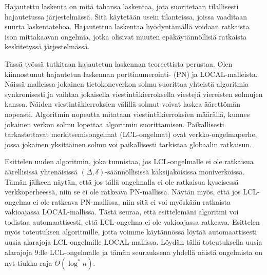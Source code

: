 \begin{abstractpage}[finnish]
Hajautettu laskenta on mitä tahansa laskentaa, jota suoritetaan tilallisesti hajautetussa järjestelmässä.
Sitä käytetään usein tilanteissa, joissa vaaditaan suurta laskentatehoa.
Hajautettua laskentaa hyödyntämällä voidaan ratkaista ison mittakaavan ongelmia, jotka olisivat muuten epäkäytännöllisiä ratkaista keskitetyssä järjestelmässä.

Tässä työssä tutkitaan hajautetun laskennan teoreettista perustaa.
Olen kiinnostunut hajautetun laskennan porttinumerointi- (PN) ja LOCAL-malleista.
Näissä malleissa jokainen tietokoneverkon solmu suorittaa yhteistä algoritmia synkronisesti ja vaihtaa jokaisella viestintäkierroksella viestejä viereisten solmujen kanssa.
Näiden viestintäkierroksien välillä solmut voivat laskea äärettömän nopeasti.
Algoritmin nopeutta mitataan viestintäkierroksien määrällä, kunnes jokainen verkon solmu lopettaa algoritmin suorittamisen.
Paikallisesti tarkastettavat merkitsemisongelmat (LCL-ongelmat) ovat verkko-ongelmaperhe, jossa jokainen yksittäinen solmu voi paikallisesti tarkistaa globaalin ratkaisun.

Esittelen uuden algoritmin, joka tunnistaa, jos LCL-ongelmalle ei ole ratkaisua äärellisissä yhtenäisissä $(\Delta, \delta)$-säännöllisissä kaksijakoisissa moniverkoissa.
Tämän jälkeen näytän, että jos tällä ongelmalla ei ole ratkaisua kyseisessä verkkoperheessä, niin se ei ole ratkeava PN-mallissa.
Näytän myös, että jos LCL-ongelma ei ole ratkeava PN-mallissa, niin sitä ei voi myöskään ratkaista vakioajassa LOCAL-mallissa.
Tästä seuraa, että esittelemäni algoritmi voi todistaa automaattisesti, että LCL-ongelma ei ole vakioajassa ratkeava.
Esittelen myös toteutuksen algoritmille, jotta voimme käytännössä löytää automaattisesti uusia alarajoja LCL-ongelmille LOCAL-mallissa.
Löydän tällä toteutuksella uusia alarajoja 9:lle LCL-ongelmalle ja tämän seurauksena yhdellä näistä ongelmista on nyt tiukka raja $\Theta(\log^* n)$.
\end{abstractpage}
